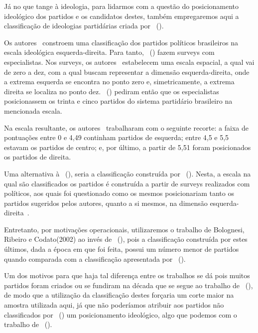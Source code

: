 \documentclass[
	12pt,				%
	openright,			%
	twoside,			%
	a4paper,			%
	openany,
	english,			%
	brazil				%
	]{abntex2}
\begin{document}
Já no que tange à ideologia, para lidarmos com a questão do posicionamento ideológico dos partidos e os candidatos destes, também empregaremos aqui a classificação de ideologias partidárias criada por ~(\citeyear{Bolognesi2022Sep}).

Os autores~\cite{Bolognesi2022Sep} constroem uma classificação dos partidos políticos brasileiros na escala ideológica esquerda-direita. Para tanto, ~(\citeyear{Bolognesi2022Sep}) fazem surveys com especialistas. Nos surveys, os autores~\cite{Bolognesi2022Sep} estabelecem uma escala espacial, a qual vai de zero a dez, com a qual buscam representar a dimensão esquerda-direita, onde a extrema esquerda se encontra no ponto zero e, simetricamente, a extrema direita se localiza no ponto dez. ~(\citeyear{Bolognesi2022Sep}) pediram então que os especialistas posicionassem os trinta e cinco partidos do sistema partidário brasileiro na mencionada escala.

Na escala resultante, os autores~\cite{Bolognesi2022Sep} trabalharam com o seguinte recorte: a faixa de pontuações entre 0 e 4,49 continham partidos de esquerda; entre 4,5 e 5,5 estavam os partidos de centro; e, por último, a partir de 5,51 foram posicionados os partidos de direita.

Uma alternativa à ~(\citeyear{Bolognesi2022Sep}), seria a classificação construída por ~(\citeyear{Power2009}). Nesta, a escala na qual são classificados os partidos é construída a partir de surveys realizados com políticos, aos quais foi questionado como os mesmos posicionariam tanto os partidos sugeridos pelos autores, quanto a si mesmos, na dimensão esquerda-direita~\cite{Power2009}.

Entretanto, por motivações operacionais, utilizaremos o trabalho de Bolognesi, Ribeiro e Codato(2002) ao invés de ~(\citeyear{Power2009}), pois a classificação construída por estes últimos, dada a época em que foi feita, possui um número menor de partidos quando comparada com a classificação apresentada por ~(\citeyear{Bolognesi2022Sep}). 

Um dos motivos para que haja tal diferença entre os trabalhos se dá pois muitos partidos foram criados ou se fundiram na década que se segue ao trabalho de ~(\citeyear{Power2009}), de modo que a utilização da classificação destes forçaria um corte maior na amostra utilizada aqui, já que não poderíamos atribuir aos partidos não classificados por ~(\citeyear{Power2009}) um posicionamento ideológico, algo que podemos com o trabalho de ~(\citeyear{Bolognesi2022Sep}).
\end{document}
